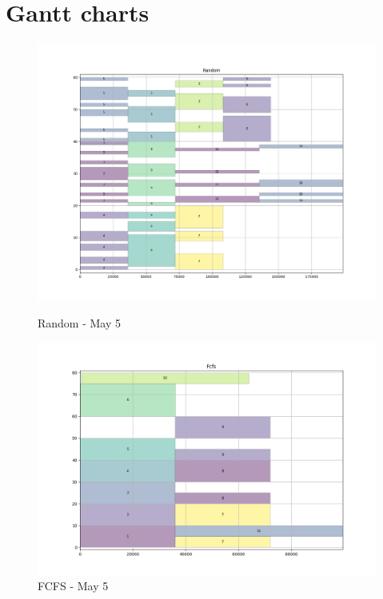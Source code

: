 \documentclass[a4paper]{article}
\begin{document}
\section{Gantt charts}
\begin{figure}[H] 
  \begin{minipage}[b]{0.5\linewidth}
    \centering
    \includegraphics[width=1.11\linewidth]{MBSS/plot/Gantt_charts/test/Random.png} 
    \caption{Random - May 5} 
    \vspace{4ex}
  \end{minipage}%
  \begin{minipage}[b]{0.5\linewidth}
    \centering
    \includegraphics[width=1.11\linewidth]{MBSS/plot/Gantt_charts/test/Fcfs.png} 
    \caption{FCFS - May 5} 
    \vspace{4ex}

\end{minipage}
\end{figure}
\end{document}
